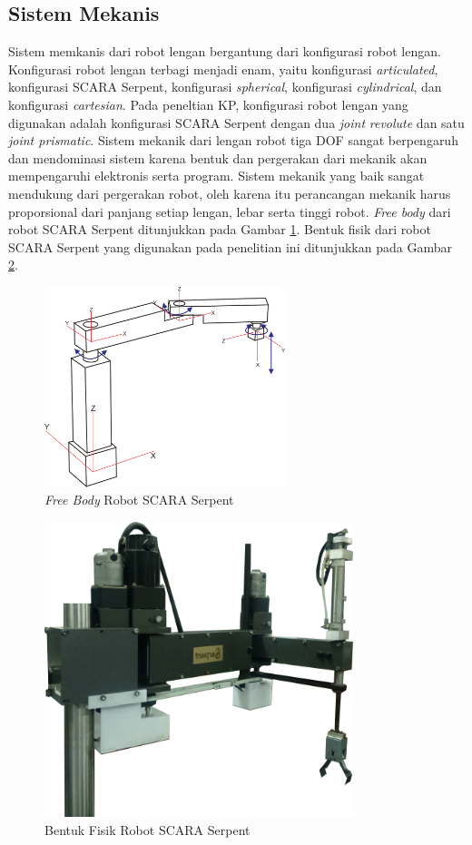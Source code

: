 \subsection{ Sistem Mekanis }
Sistem memkanis dari robot lengan bergantung dari konfigurasi robot lengan. Konfigurasi robot lengan terbagi menjadi enam, yaitu konfigurasi \textit{articulated}, konfigurasi SCARA Serpent, konfigurasi \textit{spherical}, konfigurasi \textit{cylindrical}, dan konfigurasi \textit{cartesian}. Pada peneltian KP, konfigurasi robot lengan yang digunakan adalah konfigurasi SCARA Serpent dengan dua \textit{joint} \textit{revolute} dan satu \textit{joint prismatic}. Sistem mekanik dari lengan robot tiga DOF sangat berpengaruh dan mendominasi sistem karena bentuk dan pergerakan dari mekanik akan mempengaruhi elektronis serta program. Sistem mekanik yang baik sangat mendukung dari pergerakan robot, oleh karena itu perancangan mekanik harus proporsional dari panjang setiap lengan, lebar serta tinggi robot. \textit{Free body} dari robot SCARA Serpent ditunjukkan pada Gambar \ref{pic.freebodySCARA}. Bentuk fisik dari robot SCARA Serpent yang digunakan pada penelitian ini ditunjukkan pada Gambar \ref{pic.fisikSCARA}. 
\begin{figure}[H]
	\centering
	\includegraphics[width=7cm]{gambar/SCARAA.png}
	\caption{\textit{Free Body} Robot SCARA Serpent}
	\label{pic.freebodySCARA}
\end{figure}
\begin{figure}[H]
	\centering
	\includegraphics[width=9cm]{gambar/3dSCARA.png}
	\caption{Bentuk Fisik Robot SCARA Serpent}
	\label{pic.fisikSCARA}
\end{figure}
